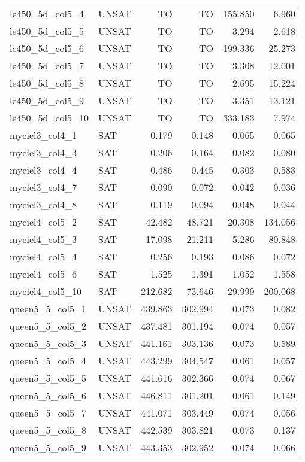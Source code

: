 \begin{tabular}{ll|rrrr}
  le450\_5d\_col5\_4 & UNSAT & TO & TO & 155.850 & 6.960 \\
  le450\_5d\_col5\_5 & UNSAT & TO & TO & 3.294 & 2.618 \\
  le450\_5d\_col5\_6 & UNSAT & TO & TO & 199.336 & 25.273 \\
  le450\_5d\_col5\_7 & UNSAT & TO & TO & 3.308 & 12.001 \\
  le450\_5d\_col5\_8 & UNSAT & TO & TO & 2.695 & 15.224 \\
  le450\_5d\_col5\_9 & UNSAT & TO & TO & 3.351 & 13.121 \\ \hline
  le450\_5d\_col5\_10 & UNSAT & TO & TO & 333.183 & 7.974 \\
  myciel3\_col4\_1 & SAT & 0.179 & 0.148 & 0.065 & 0.065 \\
  myciel3\_col4\_3 & SAT & 0.206 & 0.164 & 0.082 & 0.080 \\
  myciel3\_col4\_4 & SAT & 0.486 & 0.445 & 0.303 & 0.583 \\
  myciel3\_col4\_7 & SAT & 0.090 & 0.072 & 0.042 & 0.036 \\
  myciel3\_col4\_8 & SAT & 0.119 & 0.094 & 0.048 & 0.044 \\
  myciel4\_col5\_2 & SAT & 42.482 & 48.721 & 20.308 & 134.056 \\
  myciel4\_col5\_3 & SAT & 17.098 & 21.211 & 5.286 & 80.848 \\
  myciel4\_col5\_4 & SAT & 0.256 & 0.193 & 0.086 & 0.072 \\
  myciel4\_col5\_6 & SAT & 1.525 & 1.391 & 1.052 & 1.558 \\ \hline
  myciel4\_col5\_10 & SAT & 212.682 & 73.646 & 29.999 & 200.068 \\
  queen5\_5\_col5\_1 & UNSAT & 439.863 & 302.994 & 0.073 & 0.082 \\
  queen5\_5\_col5\_2 & UNSAT & 437.481 & 301.194 & 0.074 & 0.057 \\
  queen5\_5\_col5\_3 & UNSAT & 441.161 & 303.136 & 0.073 & 0.589 \\
  queen5\_5\_col5\_4 & UNSAT & 443.299 & 304.547 & 0.061 & 0.057 \\
  queen5\_5\_col5\_5 & UNSAT & 441.616 & 302.366 & 0.074 & 0.067 \\
  queen5\_5\_col5\_6 & UNSAT & 446.811 & 301.201 & 0.061 & 0.149 \\
  queen5\_5\_col5\_7 & UNSAT & 441.071 & 303.449 & 0.074 & 0.056 \\
  queen5\_5\_col5\_8 & UNSAT & 442.539 & 303.821 & 0.073 & 0.137 \\
  queen5\_5\_col5\_9 & UNSAT & 443.353 & 302.952 & 0.074 & 0.066 \\ \hline

\end{tabular}
